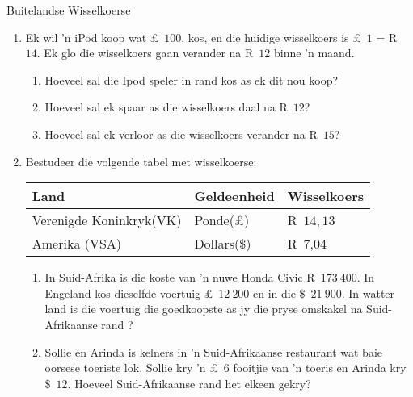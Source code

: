 \begin{exercises}{Buitelandse Wisselkoerse}
{
    \begin{enumerate}[label=\textbf{\arabic*}.]
	\item Ek wil ’n iPod koop wat £~$100$, kos, en die huidige wisselkoers is £~$1$ = R~$14$. Ek glo die wisselkoers gaan verander na R~$12$ binne ’n maand.
	\begin{enumerate}
	    \item Hoeveel sal die Ipod speler in rand kos as ek dit nou koop?
	    \item Hoeveel sal ek spaar as die wisselkoers daal na R~$12$?
	    \item Hoeveel sal ek verloor as die wisselkoers verander na R~$15$?
	\end{enumerate}

	\item Bestudeer die volgende tabel met wisselkoerse:
	\begin{center}
	    \begin{tabular}{ |l|l|l| }
		\hline
		Land	&	Geldeenheid 	&	Wisselkoers\\ \hline
		Verenigde Koninkryk(VK) 	&	Ponde(£)	&	R~$14,13$\\ \hline
		Amerika (VSA) 	&	Dollars(\$)	&	R~7,04\\ \hline
	    \end{tabular}
	\end{center}
	
	\begin{enumerate}
	    \item In Suid-Afrika is die koste van ’n nuwe Honda Civic R~$173~400$. In Engeland kos dieselfde voertuig £~$12~200$ en in die \$~$21~900$. In watter land is die voertuig die goedkoopste as jy die pryse
omskakel na Suid-Afrikaanse rand ?

	    \item Sollie en Arinda is kelners in ’n Suid-Afrikaanse restaurant wat baie oorsese toeriste lok. Sollie kry ’n £~$6$ fooitjie van ’n toeris en Arinda kry \$~$12$.  Hoeveel Suid-Afrikaanse rand het elkeen gekry?
	\end{enumerate}
    \end{enumerate}

}
\end{exercises}



